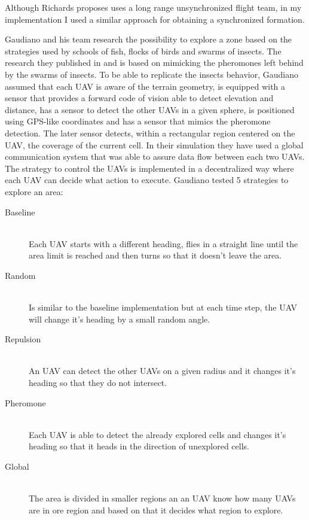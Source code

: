 Although Richards proposes uses a long range unsynchronized flight team, in my 
implementation I used a similar approach for obtaining a synchronized formation.

Gaudiano and his team research the possibility to explore a zone based on the 
strategies used by schools of fish,  flocks of birds and swarms of insects. 
The research they published in \cite{bugs} and \cite{paradigm} is based on 
mimicking the pheromones left behind by the swarms of insects. To be able to 
replicate the insects behavior, Gaudiano assumed that each UAV is aware of the 
terrain geometry, is equipped with a sensor that provides a forward code of vision
able to detect elevation and distance, has a sensor to detect the other UAVs 
in a given sphere, is positioned using GPS-like coordinates and has a sensor
that mimics the pheromone detection. The later sensor detects, within a rectangular
region centered on the UAV, the coverage of the current cell. In their simulation
they have used a global communication system that was able to assure data flow
between each two UAVs. The strategy to control the UAVs is implemented in a 
decentralized way where each UAV can decide what action to execute. Gaudiano 
tested 5 strategies to explore an area:

\begin{description}
\item[Baseline] \hfill \\ Each UAV starts with a different heading, flies in a straight line
until the area limit is reached and then turns so that it doesn't leave the area.
\item[Random] \hfill \\ Is similar to the baseline implementation but at each time step, 
the UAV will change it's heading by a small random angle.
\item[Repulsion] \hfill \\ An UAV can detect the other UAVs on a given radius and it changes
it's heading so that they do not intersect.
\item[Pheromone] \hfill \\ Each UAV is able to detect the already explored cells and changes it's
heading so that it heads in the direction of unexplored cells.
\item[Global]  \hfill \\ The area is divided in smaller regions an an UAV know how many 
UAVs are in ore region and based on that it decides what region to explore.
\end{description}

